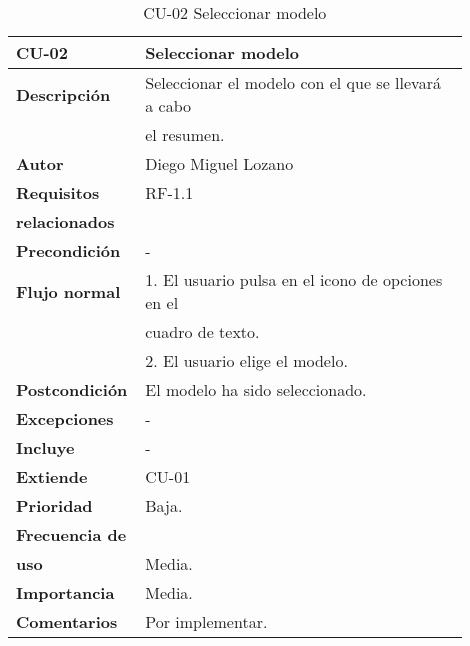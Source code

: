 \begin{longtable}{>{\raggedright}b{0.2\linewidth}>{\raggedright\arraybackslash}b{0.7\linewidth}}
	\toprule
	\textbf{CU-02} & \textbf{Seleccionar modelo} \\
	\toprule
	\endhead
	
	\toprule
	\caption{CU-02 Seleccionar modelo}
	\endfoot
	
	\small{\textbf{Descripción}} & Seleccionar el modelo con el que se llevará a cabo \\
	& el resumen. \\
	\small{\textbf{Autor}} & Diego Miguel Lozano \\
	\small{\textbf{Requisitos}} & RF-1.1  \\
	\small{\textbf{relacionados}} & \\
	\small{\textbf{Precondición}} & - \\
	\small{\textbf{Flujo normal}} & \quad \small{1. El usuario pulsa en el icono de opciones en el} \\
	& \qquad \small{cuadro de texto.} \\
	& \quad \small{2. El usuario elige el modelo.} \\
	\small{\textbf{Postcondición}} & El modelo ha sido seleccionado. \\
	\small{\textbf{Excepciones}} & - \\
	\small{\textbf{Incluye}} & - \\
	\small{\textbf{Extiende}} & CU-01 \\
	\small{\textbf{Prioridad}} & Baja. \\
	\small{\textbf{Frecuencia de}} & \\
	\small{\textbf{uso}} & Media. \\
	\small{\textbf{Importancia}} & Media. \\
	\small{\textbf{Comentarios}} &  Por implementar. \\
\end{longtable}


